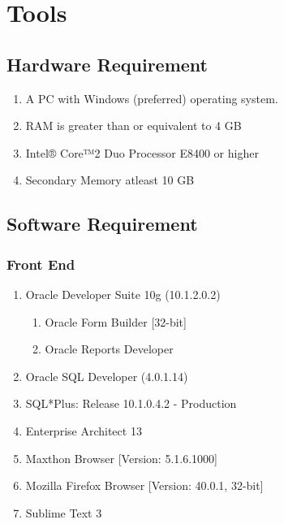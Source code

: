 \documentclass[12pt]{report} %
\begin{document}
\chapter{Tools}
\setcounter{page}{1}

\section{Hardware Requirement} %
\renewcommand{\labelenumi}{\alph{enumi})}
	\begin{enumerate}
  		\item A PC with Windows (preferred) operating system.
  		\item RAM is greater than or equivalent to 4 GB
  		\item Intel® Core™2 Duo Processor E8400 or higher  
  		\item Secondary Memory atleast 10 GB
	\end{enumerate}





\section{Software Requirement}
\thispagestyle{empty}    %
\subsection{Front End}
\renewcommand{\labelenumi}{\alph{enumi})}
\begin{enumerate}
  \item Oracle Developer Suite 10g (10.1.2.0.2) 
  	\begin{enumerate}
  		\item Oracle Form Builder [32-bit]
  		\item Oracle Reports Developer
	\end{enumerate}
	
  \item Oracle SQL Developer (4.0.1.14)
  \item SQL*Plus: Release 10.1.0.4.2 - Production
  \item Enterprise Architect 13 
  \item Maxthon Browser [Version: 5.1.6.1000]
  \item Mozilla Firefox Browser [Version: 40.0.1, 32-bit]
  \item Sublime Text 3
\end{enumerate}
\end{document}
